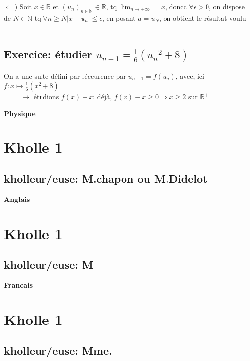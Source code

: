 \documentclass{article}
\begin{document}
$\Leftarrow )$ Soit $x \in \mathbb{R}$ et $\left(u_n \right)_{n \in \mathbb{N}} \in \mathbb{R}$, tq $\lim_{n \rightarrow + \infty} = x$, doncc $\forall \epsilon > 0$, on dispose de $N \in \mathbb{N}$ tq $\forall n \geqslant N |x-u_n| \leqslant \epsilon$, en posant $a = u_N$, on obtient le résultat voulu \\ \\

\subsection{Exercice: étudier $u_{n+1} = \frac{1}{6} \left({u_n}^2 + 8 \right)$ }
\vspace{0.4cm}

On a une suite défini par réccurence par $u_{n+1} = f( u_n )$, avec, ici $f: x \mapsto \frac{1}{6} \left(x^2 + 8 \right)$ \\

$\hspace{1cm} \rightarrow$ étudions $f(x) - x$: déjà, $f(x) - x \geqslant 0 \Rightarrow x \geqslant 2$ sur $\mathbb{R}^+$





\begin{center}
\textbf{\large Physique}
\end{center} \vspace{0.2cm}

\section{Kholle 1}
\subsection{kholleur/euse: M.chapon ou M.Didelot}

\vspace{5mm}


\begin{center}
\textbf{\large Anglais}
\end{center} \vspace{0.2cm}

\section{Kholle 1}
\subsection{kholleur/euse: M}


\begin{center}
\textbf{\large Francais}
\end{center} \vspace{0.2cm}

\section{Kholle 1}
\subsection{kholleur/euse: Mme.}
\end{document}
